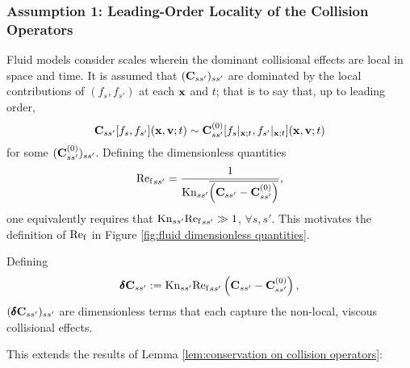 \subsubsection*{Assumption 1: Leading-Order Locality of the Collision Operators}
    Fluid models consider scales wherein the dominant collisional effects are local in space and time. It is assumed that $(\mathbf{C}_{ss'})_{ss'}$ are dominated by the local contributions of $(f_{s}, f_{s'})$ at each $\mathbf{x}$ and $t$; that is to say that, up to leading order,
    \begin{equation}\label{eqn:local collision operator}
        \mathbf{C}_{ss'}[f_{s}, f_{s'}](\mathbf{x}, \mathbf{v}; t)  \sim  \mathbf{C}_{ss'}^{(0)}[f_{s}|_{\mathbf{x}; t}, f_{s'}|_{\mathbf{x}; t}](\mathbf{x}, \mathbf{v}; t)
    \end{equation}
    for some $(\mathbf{C}_{ss'}^{(0)})_{ss'}$. Defining the dimensionless quantities
    \begin{equation}
        {\mathrm{Re}_{\mathrm{f}}}_{ss'}  =  \frac{1}{\mathrm{Kn}_{ss'}\overline{\left(\mathbf{C}_{ss'} - \mathbf{C}_{ss'}^{(0)}\right)}},
    \end{equation}
    one equivalently requires that $\mathrm{Kn}_{ss'}{\mathrm{Re}_{\mathrm{f}}}_{ss'}  \gg  1$, $\forall s, s'$. This motivates the definition of $\mathrm{Re}_{\mathrm{f}}$ in Figure \ref{fig:fluid dimensionless quantities}.

    Defining
    \begin{equation}
        \pmb{\mathsf{\delta}}\mathbf{C}_{ss'}  :=  \mathrm{Kn}_{ss'}{\mathrm{Re}_{\mathrm{f}}}_{ss'}\left(\mathbf{C}_{ss'} - \mathbf{C}_{ss'}^{(0)}\right),
    \end{equation}
    $(\pmb{\mathsf{\delta}}\mathbf{C}_{ss'})_{ss'}$ are dimensionless terms that each capture the non-local, viscous collisional effects.
    
    This extends the results of Lemma \ref{lem:conservation on collision operators}:

